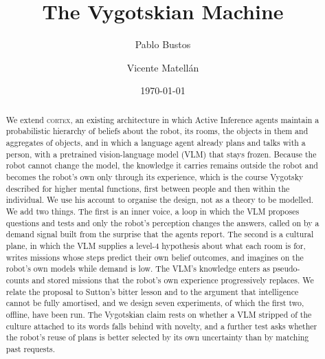 \documentclass[a4paper, twoside]{article}
\title{The Vygotskian Machine}
\author{Pablo Bustos \and Vicente Matell\'an}
\date{\today}
\providecommand{\cortex}{\textsc{cortex}}
\begin{document}
\maketitle
\begin{abstract}
We extend \cortex{}, an existing architecture in which Active Inference agents maintain a probabilistic hierarchy of
beliefs about the robot, its rooms, the objects in them and aggregates of objects, and in which a language agent
already plans and talks with a person, with a pretrained vision-language model (VLM) that stays frozen. Because the
robot cannot change the model, the knowledge it carries remains outside the robot and becomes the robot's own only
through its experience, which is the course Vygotsky described for higher mental functions, first between people and
then within the individual. We use his account to organise the design, not as a theory to be modelled. We add two things. The
first is an inner voice, a loop in which the VLM proposes questions and tests and only the
robot's perception changes the answers, called on by a demand signal built from the surprise that the agents report.
The second is a cultural plane, in which the VLM supplies a level-4 hypothesis about what each room is for, writes
missions whose steps predict their own belief outcomes, and imagines on the robot's own models while demand is low.
The VLM's knowledge enters as pseudo-counts and stored missions that the robot's own experience progressively
replaces. We relate the proposal to Sutton's bitter lesson and to the argument that intelligence cannot be fully
amortised, and we design seven experiments, of which the first two, offline, have been run. The Vygotskian claim rests on whether a VLM stripped of
the culture attached to its words falls behind with novelty, and a further test asks whether the robot's reuse of
plans is better selected by its own uncertainty than by matching past requests.
\end{abstract}






\renewcommand*{\bibfont}{\footnotesize\setlength{\parskip}{0pt}}\setlength{\bibitemsep}{0pt}
\printbibliography
\end{document}
